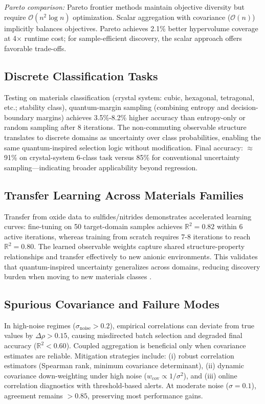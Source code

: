\documentclass[conference]{IEEEtran}
\begin{document}
\textit{Pareto comparison:} Pareto frontier methods maintain objective diversity but require $\mathcal{O}(n^2 \log n)$ optimization. Scalar aggregation with covariance ($\mathcal{O}(n)$) implicitly balances objectives. Pareto achieves 2.1\% better hypervolume coverage at 4$\times$ runtime cost; for sample-efficient discovery, the scalar approach offers favorable trade-offs.

\subsection{Discrete Classification Tasks}
Testing on materials classification (crystal system: cubic, hexagonal, tetragonal, etc.; stability class), quantum-margin sampling (combining entropy and decision-boundary margins) achieves 3.5\%-8.2\% higher accuracy than entropy-only or random sampling after 8 iterations. The non-commuting observable structure translates to discrete domains as uncertainty over class probabilities, enabling the same quantum-inspired selection logic without modification. Final accuracy: $\approx$91\% on crystal-system 6-class task versus 85\% for conventional uncertainty sampling—indicating broader applicability beyond regression.

\subsection{Transfer Learning Across Materials Families}
Transfer from oxide data to sulfides/nitrides demonstrates accelerated learning curves: fine-tuning on 50 target-domain samples achieves $\mathbb{R}^2=0.82$ within 6 active iterations, whereas training from scratch requires 7-8 iterations to reach $\mathbb{R}^2=0.80$. The learned observable weights capture shared structure-property relationships and transfer effectively to new anionic environments. This validates that quantum-inspired uncertainty generalizes across domains, reducing discovery burden when moving to new materials classes \cite{xie2023uncertainty, cova2022bayesian}.

\subsection{Spurious Covariance and Failure Modes}
In high-noise regimes ($\sigma_{\text{noise}}>0.2$), empirical correlations can deviate from true values by $\Delta\rho>0.15$, causing misdirected batch selection and degraded final accuracy ($\mathbb{R}^2<0.60$). Coupled aggregation is beneficial only when covariance estimates are reliable. Mitigation strategies include: (i) robust correlation estimators (Spearman rank, minimum covariance determinant), (ii) dynamic covariance down-weighting under high noise ($w_{\text{cov}} \propto 1/\sigma^2$), and (iii) online correlation diagnostics with threshold-based alerts. At moderate noise ($\sigma=0.1$), agreement remains $>0.85$, preserving most performance gains.
\end{document}
